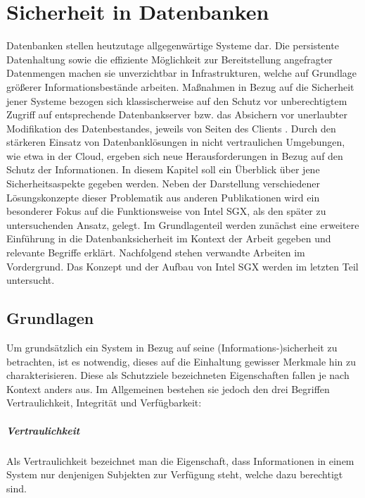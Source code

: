 
\chapter{Sicherheit in Datenbanken}
Datenbanken stellen heutzutage allgegenwärtige Systeme dar. Die persistente Datenhaltung sowie die effiziente Möglichkeit zur Bereitstellung angefragter Datenmengen machen sie unverzichtbar in Infrastrukturen, welche auf Grundlage größerer Informationsbestände arbeiten. Maßnahmen in Bezug auf die Sicherheit jener Systeme bezogen sich klassischerweise auf den Schutz vor unberechtigtem Zugriff auf entsprechende Datenbankserver bzw. das Absichern vor unerlaubter Modifikation des Datenbestandes, jeweils von Seiten des Clients \cite{BSI1}. Durch den stärkeren Einsatz von Datenbanklösungen in nicht vertraulichen Umgebungen, wie etwa in der Cloud, ergeben sich neue Herausforderungen in Bezug auf den Schutz der Informationen. In diesem Kapitel soll ein Überblick über jene Sicherheitsaspekte gegeben werden. Neben der Darstellung verschiedener Lösungskonzepte dieser Problematik aus anderen Publikationen wird ein besonderer Fokus auf die Funktionsweise von Intel SGX, als den später zu untersuchenden Ansatz, gelegt. Im Grundlagenteil werden zunächst eine erweitere Einführung in die Datenbanksicherheit im Kontext der Arbeit gegeben und relevante Begriffe erklärt. Nachfolgend stehen verwandte Arbeiten im Vordergrund. Das Konzept und der Aufbau von Intel SGX werden im letzten Teil untersucht.

\section{Grundlagen}
Um grundsätzlich ein System in Bezug auf seine (Informations-)sicherheit zu betrachten, ist es notwendig, dieses auf die Einhaltung gewisser Merkmale hin zu charakterisieren. Diese als Schutzziele bezeichneten Eigenschaften fallen je nach Kontext anders aus. Im Allgemeinen bestehen sie jedoch den drei Begriffen Vertraulichkeit, Integrität und Verfügbarkeit:

\paragraph{Vertraulichkeit}
Als Vertraulichkeit bezeichnet man die Eigenschaft, dass Informationen in einem System nur denjenigen Subjekten zur Verfügung steht, welche dazu berechtigt sind.

